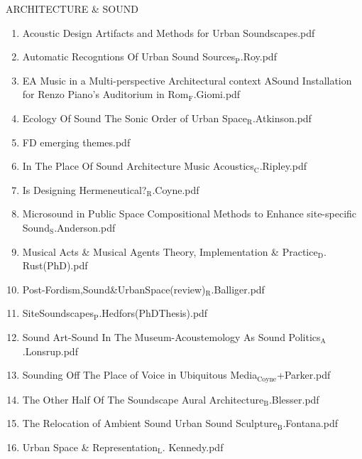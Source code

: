 \documentclass[11pt]{article}
\begin{document}
\item ARCHITECTURE \& SOUND
\label{sec-1-1-1-1-49-1-2}
\begin{enumerate}
\item Acoustic Design Artifacts and Methods for Urban Soundscapes.pdf
\label{sec-1-1-1-1-49-1-2-1}

\item Automatic Recogntions Of Urban Sound Sources$_{\text{P}}$.Roy.pdf
\label{sec-1-1-1-1-49-1-2-2}

\item EA Music in a Multi-perspective Architectural context ASound Installation for Renzo Piano's Auditorium in Rom$_{\text{F}}$.Giomi.pdf
\label{sec-1-1-1-1-49-1-2-3}

\item Ecology Of Sound The Sonic Order of Urban Space$_{\text{R}}$.Atkinson.pdf
\label{sec-1-1-1-1-49-1-2-4}

\item FD emerging themes.pdf
\label{sec-1-1-1-1-49-1-2-5}

\item In The Place Of Sound Architecture Music Acoustics$_{\text{C}}$.Ripley.pdf
\label{sec-1-1-1-1-49-1-2-6}

\item Is Designing Hermeneutical?$_{\text{R}}$.Coyne.pdf
\label{sec-1-1-1-1-49-1-2-7}

\item Microsound in Public Space Compositional Methods to Enhance site-specific Sound$_{\text{S}}$.Anderson.pdf
\label{sec-1-1-1-1-49-1-2-8}

\item Musical Acts \& Musical Agents Theory, Implementation \& Practice$_{\text{D}}$. Rust(PhD).pdf
\label{sec-1-1-1-1-49-1-2-9}

\item Post-Fordism,Sound\&UrbanSpace(review)$_{\text{R}}$.Balliger.pdf
\label{sec-1-1-1-1-49-1-2-10}

\item SiteSoundscapes$_{\text{P}}$.Hedfors(PhDThesis).pdf
\label{sec-1-1-1-1-49-1-2-11}

\item Sound Art-Sound In The Museum-Acoustemology As Sound Politics$_{\text{A}}$.Lonsrup.pdf
\label{sec-1-1-1-1-49-1-2-12}

\item Sounding Off The Place of Voice in Ubiquitous Media$_{\text{Coyne}}$+Parker.pdf
\label{sec-1-1-1-1-49-1-2-13}

\item The Other Half Of The Soundscape Aural Architecture$_{\text{B}}$.Blesser.pdf
\label{sec-1-1-1-1-49-1-2-14}

\item The Relocation of Ambient Sound Urban Sound Sculpture$_{\text{B}}$.Fontana.pdf
\label{sec-1-1-1-1-49-1-2-15}

\item Urban Space \& Representation$_{\text{L}}$. Kennedy.pdf
\label{sec-1-1-1-1-49-1-2-16}
\end{enumerate}
\end{document}

